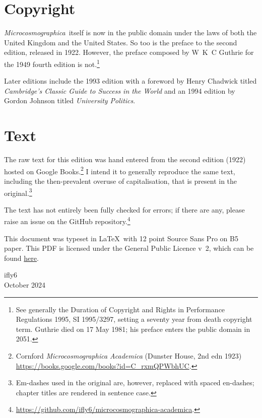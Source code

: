 \documentclass[12pt, oneside, b5paper]{memoir}
\newcommand{\ma}{\textit{Microcosmographica Academica}}
\newcommand{\mashort}{\textit{Microcosmographica}}
\begin{document}
\section*{Copyright}
\mashort\ itself is now in the public domain under the laws of both the United Kingdom and the United States. So too is the preface to the second edition, released in 1922. However, the preface composed by W~K~C Guthrie for the 1949 fourth edition is not.\footnote{See generally the Duration of Copyright and Rights in Performance Regulations 1995, SI 1995/3297, setting a seventy year from death copyright term. Guthrie died on 17 May 1981; his preface enters the public domain in 2051.}

Later editions include the 1993 edition with a foreword by Henry Chadwick titled \emph{Cambridge's Classic Guide to Success in the World} and an 1994 edition by Gordon Johnson titled \emph{University Politics}.

\section*{Text}
The raw text for this edition was hand entered from the second edition (1922) hosted on Google Books.\footnote{Cornford \emph{\ma} (Dunster House, 2nd edn 1923) \url{https://books.google.com/books?id=C_rxmQPWbhUC}.} I intend it to generally reproduce the same text, including the then-prevalent overuse of capitalisation, that is present in the original.\footnote{Em-dashes used in the original are, however, replaced with spaced en-dashes; chapter titles are rendered in sentence case.}

The text has not entirely been fully checked for errors; if there are any, please raise an issue on the GitHub repository.\footnote{\url{https://github.com/ifly6/microcosmographica-academica}.}

This document was typeset in \LaTeX\ with 12 point Source Sans Pro on B5 paper. This PDF is licensed under the General Public Licence v~2, which can be found \href{https://github.com/ifly6/microcsmographica-academica/blob/main/LICENSE}{here}.

\begin{flushright}
	ifly6 \\
	October 2024
\end{flushright}

%
\end{document}

